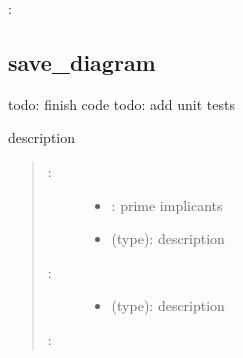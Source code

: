 \documentclass[letterpaper,10pt,english]{sphinxmanual}
\begin{document}
\begin{fulllineitems}
:

\begin{sphinxVerbatim}[commandchars=\\\{\}]
   
 
\end{sphinxVerbatim}

\end{fulllineitems}



\subsection{save\_diagram}
\label{\detokenize{Phenotypes:phenotypes-save-diagram}}\label{\detokenize{Phenotypes:save-diagram}}

\begin{fulllineitems}
\label{\detokenize{Phenotypes:PyBoolNet.Phenotypes.save_diagram}}
todo: finish code
todo: add unit tests

description
\begin{quote}
\begin{description}
\item[{:}] \leavevmode\begin{itemize}
\item {} 
: prime implicants

\item {} 
 (type): description

\end{itemize}

\item[{:}] \leavevmode\begin{itemize}
\item {} 
 (type): description

\end{itemize}

\end{description}

:

\begin{sphinxVerbatim}[commandchars=\\\{\}]
\end{sphinxVerbatim}
\end{quote}

\end{fulllineitems}
\end{document}
